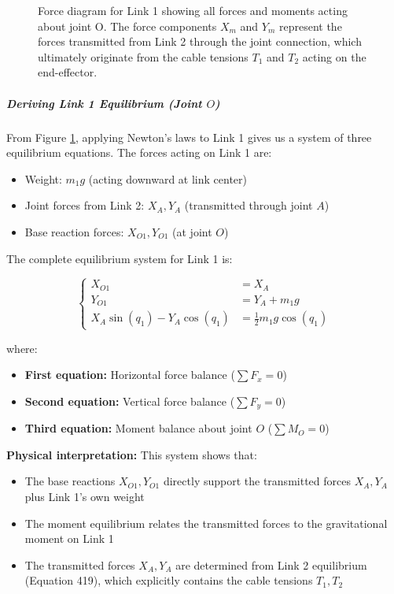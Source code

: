 \begin{figure}[H]
\centering

\caption{Force diagram for Link 1 showing all forces and moments acting about joint O. The force components $X_m$ and $Y_m$ represent the forces transmitted from Link 2 through the joint connection, which ultimately originate from the cable tensions $T_1$ and $T_2$ acting on the end-effector.}
\label{fig:link1_force_diagram}
\end{figure}

\subparagraph{Deriving Link 1 Equilibrium (Joint $O$)}

From Figure \ref{fig:link1_force_diagram}, applying Newton's laws to Link 1 gives us a system of three equilibrium equations. The forces acting on Link 1 are:
\begin{itemize}
    \item Weight: $m_1 g$ (acting downward at link center)
    \item Joint forces from Link 2: $X_A, Y_A$ (transmitted through joint $A$)
    \item Base reaction forces: $X_{O1}, Y_{O1}$ (at joint $O$)
\end{itemize}

The complete equilibrium system for Link 1 is:

\begin{equation}
\left\{
\begin{aligned}
X_{O1} &= X_A \\
Y_{O1} &= Y_A + m_1 g \\
X_A \sin(q_1) - Y_A \cos(q_1) &= \frac{1}{2}m_1 g \cos(q_1)
\end{aligned}
\right.
\tag{420}
\end{equation}

where:
\begin{itemize}
    \item \textbf{First equation:} Horizontal force balance ($\sum F_x = 0$)
    \item \textbf{Second equation:} Vertical force balance ($\sum F_y = 0$)  
    \item \textbf{Third equation:} Moment balance about joint $O$ ($\sum M_O = 0$)
\end{itemize}

\textbf{Physical interpretation:} This system shows that:
\begin{itemize}
    \item The base reactions $X_{O1}, Y_{O1}$ directly support the transmitted forces $X_A, Y_A$ plus Link 1's own weight
    \item The moment equilibrium relates the transmitted forces to the gravitational moment on Link 1
    \item The transmitted forces $X_A, Y_A$ are determined from Link 2 equilibrium (Equation 419), which explicitly contains the cable tensions $T_1, T_2$
\end{itemize}

